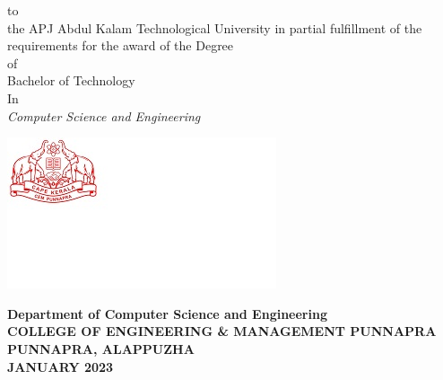 \begin{titlepage}
\begin{center}
	         to\\
	         \vspace{1cm}
	         \normalsize
	         \vspace{0.1cm}
	         the APJ Abdul Kalam Technological University in partial fulfillment of the requirements for the award of  the Degree \\
	         \vspace{0.5cm}
	         of\\
	         \vspace{1cm}
	         Bachelor of Technology\\
	            In\\
	            \textit{ Computer Science and Engineering}\\
	\vspace{1cm}
	
		\begin{center}
	\hspace{5cm}
	    	\includegraphics[]{am2.jpg}
	\end{center}
		\normalsize
		
		\textbf{Department of Computer Science and Engineering}\\[0.2cm]
		\textbf{COLLEGE OF ENGINEERING \& MANAGEMENT PUNNAPRA}\\[0.2cm]
		\textbf{PUNNAPRA, ALAPPUZHA}\\[0.2cm]
		\textbf{JANUARY 2023}\\
	\end{center}
\end{titlepage}




